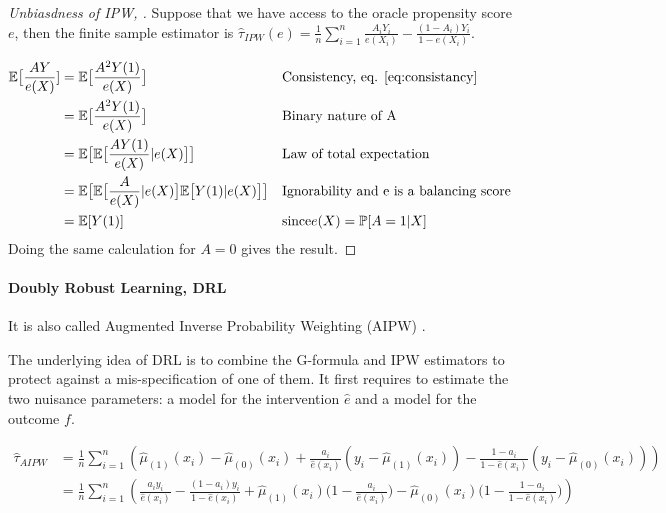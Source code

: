 \documentclass[french,12pt,twoside,a4paper]{book}
\newtheorem{proof}{Proof}
\begin{document}
\begin{appendices}
\begin{proof}[Unbiasdness of IPW, \citep{rosenbaum_central_1983}]
    Suppose that we have access to the oracle propensity score $e$, then the
    finite sample estimator is $\hat{\tau}_{IPW}(e)=\frac{1}{n} \sum_{i=1}^{n}
      \frac{A_{i} Y_{i}}{e\left(X_{i}\right)}-\frac{(1-A_{i})
      Y_{i}}{1-e\left(X_{i}\right)}$.

    \begin{align*}
      \mathbb E \big[\frac{A Y}{e(X)}] & =\mathbb E \big[\frac{A^2 Y(1)}{e(X)}\big]                                                  &  & \text{Consistency, eq. \ref{eq:consistancy}}   \\
                                       & =\mathbb E \big[\frac{A^2 Y(1)}{e(X)}\big]                                                  &  & \text{Binary nature of A}                      \\
                                       & =\mathbb E \big[\mathbb E \big[\frac{A Y(1)}{e(X)}|e(X)\big]\big]                           &  & \text{Law of total expectation}                \\
                                       & =\mathbb E \big[\mathbb E \big[\frac{A}{e(X)}|e(X)\big] \mathbb E \big[Y(1)|e(X)\big] \big] &  & \text{Ignorability and e is a balancing score} \\
                                       & =\mathbb E[Y(1)]                                                                            &  & \text{since} e(X)=\mathbb P[A=1|X]
    \end{align*}
    Doing the same calculation for $A=0$ gives the result.
  \end{proof}

  \paragraph{Doubly Robust Learning, DRL} It is also called Augmented Inverse
  Probability Weighting (AIPW) \citep{robins1994estimation}.

  The underlying idea of DRL is to combine the G-formula and IPW estimators to
  protect against a mis-specification of one of them. It first requires to
  estimate the two nuisance parameters: a model for the intervention $\hat{e}$
  and a model for the outcome $f$.

  \begin{align*} \widehat{\tau}_{A I P W} & =\frac{1}{n}
               \sum_{i=1}^{n}\left(\hat \mu_{(1)}\left(x_{i}\right)-\hat
               \mu_{(0)}\left(x_{i}\right) + \frac{a_{i}}{\hat{e}\left(x_{i}\right)} \left( y_{i}-\hat
               \mu_{(1)} \left(x_{i}\right) \right) - \frac{1-a_{i}}{1-\hat{e}\left(x_{i}\right)}
               \left( y_{i}-\hat \mu_{(0)}\left(x_{i}\right) \right)\right)                               \\
                                        & =\frac{1}{n} \sum_{i=1}^{n}\left(\frac{a_i y_i}{\hat e (x_i)} -
               \frac{(1-a_i) y_i}{1-\hat e(x_i)} + \hat \mu_{(1)}(x_{i})\big (1 -
                 \frac{a_i}{\hat e(x_i)} \big) - \hat \mu_{(0)}(x_{i}) \big (1 - \frac{1 -
                     a_i}{1 - \hat e(x_i)} \big) \right)
  \end{align*}


\end{appendices}
\end{document}
